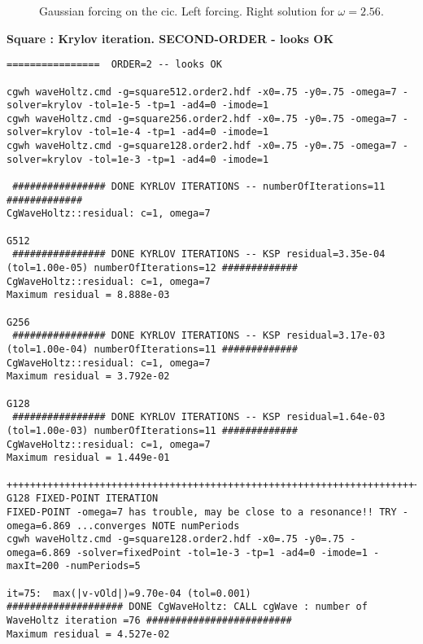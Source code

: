{%
%
\newcommand{\figWidth}{6cm}%
\newcommand{\trimfig}[2]{\trimhb{#1}{#2}{.0}{.0}{.0}{.0}}
\begin{figure}[htb]
\begin{center}
\end{center}
\caption{Gaussian forcing on the cic. Left forcing. Right solution for $\omega=2.56$. }
  \label{fig:gaussianForcingCIC}
\end{figure}
}


\bigskip
\textbf{Square  : Krylov iteration. SECOND-ORDER  - looks OK}
\begin{Verbatim}[fontsize=\scriptsize]
================  ORDER=2 -- looks OK 

cgwh waveHoltz.cmd -g=square512.order2.hdf -x0=.75 -y0=.75 -omega=7 -solver=krylov -tol=1e-5 -tp=1 -ad4=0 -imode=1
cgwh waveHoltz.cmd -g=square256.order2.hdf -x0=.75 -y0=.75 -omega=7 -solver=krylov -tol=1e-4 -tp=1 -ad4=0 -imode=1
cgwh waveHoltz.cmd -g=square128.order2.hdf -x0=.75 -y0=.75 -omega=7 -solver=krylov -tol=1e-3 -tp=1 -ad4=0 -imode=1

 ################ DONE KYRLOV ITERATIONS -- numberOfIterations=11 #############
CgWaveHoltz::residual: c=1, omega=7

G512
 ################ DONE KYRLOV ITERATIONS -- KSP residual=3.35e-04 (tol=1.00e-05) numberOfIterations=12 #############
CgWaveHoltz::residual: c=1, omega=7
Maximum residual = 8.888e-03

G256
 ################ DONE KYRLOV ITERATIONS -- KSP residual=3.17e-03 (tol=1.00e-04) numberOfIterations=11 #############
CgWaveHoltz::residual: c=1, omega=7
Maximum residual = 3.792e-02

G128
 ################ DONE KYRLOV ITERATIONS -- KSP residual=1.64e-03 (tol=1.00e-03) numberOfIterations=11 #############
CgWaveHoltz::residual: c=1, omega=7
Maximum residual = 1.449e-01

++++++++++++++++++++++++++++++++++++++++++++++++++++++++++++++++++++++++++++++++++++++++++++++++++++++++++++++++++++++++++++++
G128 FIXED-POINT ITERATION
FIXED-POINT -omega=7 has trouble, may be close to a resonance!! TRY -omega=6.869 ...converges NOTE numPeriods
cgwh waveHoltz.cmd -g=square128.order2.hdf -x0=.75 -y0=.75 -omega=6.869 -solver=fixedPoint -tol=1e-3 -tp=1 -ad4=0 -imode=1 -maxIt=200 -numPeriods=5

it=75:  max(|v-vOld|)=9.70e-04 (tol=0.001)
#################### DONE CgWaveHoltz: CALL cgWave : number of WaveHoltz iteration =76 #########################
Maximum residual = 4.527e-02

\end{Verbatim}


